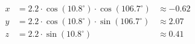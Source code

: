 \documentclass[preview]{standalone}
\begin{document}
\begin{align*}
x &= 2.2 \cdot \cos(10.8^\circ) \cdot \cos(106.7^\circ) &\approx -0.62 \\y &= 2.2 \cdot \cos(10.8^\circ) \cdot \sin(106.7^\circ) &\approx 2.07 \\z &= 2.2 \cdot \sin(10.8^\circ) &\approx 0.41
\end{align*}
\end{document}
